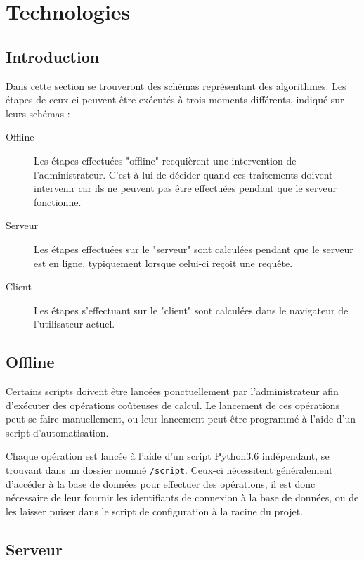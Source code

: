 
\section{Technologies}

	\subsection{Introduction}

		Dans cette section se trouveront des schémas représentant des algorithmes. Les étapes de ceux-ci peuvent être exécutés à trois moments différents, indiqué sur leurs schémas :
		\begin{description}
			\item[Offline] Les étapes effectuées "offline" recquièrent une intervention de l'administrateur. C'est à lui de décider quand ces traitements doivent intervenir car ils ne peuvent pas être effectuées pendant que le serveur fonctionne.
			\item[Serveur] Les étapes effectuées sur le "serveur" sont calculées pendant que le serveur est en ligne, typiquement lorsque celui-ci reçoit une requête.
			\item[Client] Les étapes s'effectuant sur le "client" sont calculées dans le navigateur de l'utilisateur actuel.
		\end{description}

	\subsection{Offline}

		Certains scripts doivent être lancées ponctuellement par l'administrateur afin d'exécuter des opérations coûteuses de calcul. Le lancement de ces opérations peut se faire manuellement, ou leur lancement peut être programmé à l'aide d'un script d'automatisation.

		Chaque opération est lancée à l'aide d'un script Python3.6 indépendant, se trouvant dans un dossier nommé \texttt{/script}. Ceux-ci nécessitent généralement d'accéder à la base de données pour effectuer des opérations, il est donc nécessaire de leur fournir les identifiants de connexion à la base de données, ou de les laisser puiser dans le script de configuration à la racine du projet. 

	\subsection{Serveur}

